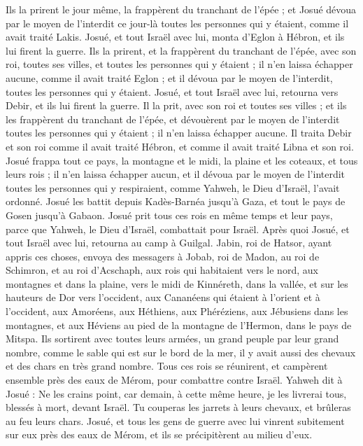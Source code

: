\begin{multicols}{2}
Ils la prirent le jour même, la frappèrent du tranchant de l’épée ; et Josué dévoua par le moyen de l'interdit ce jour-là toutes les personnes qui y étaient, comme il avait traité Lakis.
Josué, et tout Israël avec lui, monta d’Eglon à Hébron, et ils lui firent la guerre.
Ils la prirent, et la frappèrent du tranchant de l’épée, avec son roi, toutes ses villes, et toutes les personnes qui y étaient ; il n’en laissa échapper aucune, comme il avait traité Eglon ; et il dévoua par le moyen de l'interdit, toutes les personnes qui y étaient.
Josué, et tout Israël avec lui, retourna vers Debir, et ils lui firent la guerre.
Il la prit, avec son roi et toutes ses villes ; et ils les frappèrent du tranchant de l’épée, et dévouèrent par le moyen de l'interdit toutes les personnes qui y étaient ; il n’en laissa échapper aucune. Il traita Debir et son roi comme il avait traité Hébron, et comme il avait traité Libna et son roi.
Josué frappa tout ce pays, la montagne et le midi, la plaine et les coteaux, et tous leurs rois ; il n’en laissa échapper aucun, et il dévoua par le moyen de l'interdit toutes les personnes qui y respiraient, comme Yahweh, le Dieu d’Israël, l’avait ordonné.
Josué les battit depuis Kadès-Barnéa jusqu’à Gaza, et tout le pays de Gosen jusqu’à Gabaon.
Josué prit tous ces rois en même temps et leur pays, parce que Yahweh, le Dieu d’Israël, combattait pour Israël.
Après quoi Josué, et tout Israël avec lui, retourna au camp à Guilgal.
\VerseOne{}Jabin, roi de Hatsor, ayant appris ces choses, envoya des messagers à Jobab, roi de Madon, au roi de Schimron, et au roi d’Acschaph,
aux rois qui habitaient vers le nord, aux montagnes et dans la plaine, vers le midi de Kinnéreth, dans la vallée, et sur les hauteurs de Dor vers l’occident,
aux Cananéens qui étaient à l’orient et à l’occident, aux Amoréens, aux Héthiens, aux Phéréziens, aux Jébusiens dans les montagnes, et aux Héviens au pied de la montagne de l’Hermon, dans le pays de Mitspa.
Ils sortirent avec toutes leurs armées, un grand peuple par leur grand nombre, comme le sable qui est sur le bord de la mer, il y avait aussi des chevaux et des chars en très grand nombre.
Tous ces rois se réunirent, et campèrent ensemble près des eaux de Mérom, pour combattre contre Israël.
Yahweh dit à Josué : Ne les crains point, car demain, à cette même heure, je les livrerai tous, blessés à mort, devant Israël. Tu couperas les jarrets à leurs chevaux, et brûleras au feu leurs chars.
Josué, et tous les gens de guerre avec lui vinrent subitement sur eux près des eaux de Mérom, et ils se précipitèrent au milieu d’eux.

\end{multicols}
